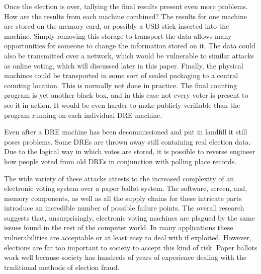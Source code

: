 \documentclass[12pt, titlepage]{article}
\begin{document}
Once the election is over, tallying the final results present even more problems. How are the results from each machine combined? The results for one machine are stored on the memory card, or possibly a USB stick inserted into the machine. Simply removing this storage to transport the data allows many opportunities for someone to change the information stored on it. The data could also be transmitted over a network, which would be vulnerable to similar attacks as online voting, which will discussed later in this paper. Finally, the physical machines could be transported in some sort of sealed packaging to a central counting location. This is normally not done in practice. The final counting program is yet another black box, and in this case not every voter is present to see it in action. It would be even harder to make publicly verifiable than the program running on each individual DRE machine.

Even after a DRE machine has been decommissioned and put in landfill it still poses problems. Some DREs are thrown away still containing real election data. Due to the logical way in which votes are stored, it is possible to reverse engineer how people voted from old DREs in conjunction with polling place records. \cite{hao2016real}

The wide variety of these attacks attests to the increased complexity of an electronic voting system over a paper ballot system. The software, screen, and, memory components, as well as all the supply chains for these intricate parts introduce an incredible number of possible failure points. The overall research suggests that, unsurprisingly, electronic voting machines are plagued by the same issues found in the rest of the computer world. In many applications these vulnerabilities are acceptable or at least easy to deal with if exploited. However, elections are far too important to society to accept this kind of risk. Paper ballots work well because society has hundreds of years of experience dealing with the traditional methods of election fraud.
\end{document}
